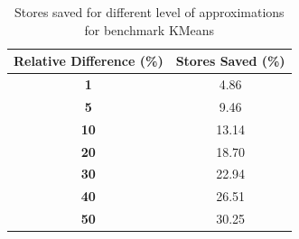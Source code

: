 \begin{table}[htbp]
\caption{Stores saved for different level of approximations for benchmark KMeans}
	\begin{center}
		\begin{tabular}{|c|c|}
			\hline

			\textbf{Relative Difference (\%)} & \textbf{Stores Saved (\%)}\\
			\hline

			\textbf{1} & 4.86\\
			\hline

			\textbf{5} & 9.46\\
			\hline

			\textbf{10} & 13.14\\
			\hline

			\textbf{20} & 18.70\\
			\hline

			\textbf{30} & 22.94\\
			\hline

			\textbf{40} & 26.51\\
			\hline

			\textbf{50} & 30.25\\
			\hline

		\end{tabular}
	\label{tab:kmeans_reldiff}
	\end{center}
\end{table}


